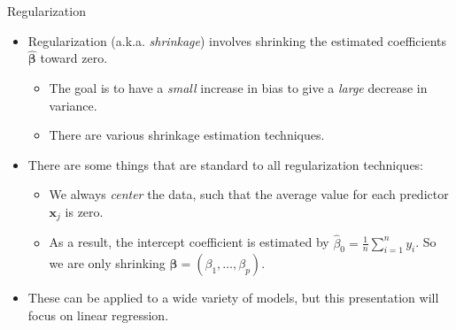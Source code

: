 \documentclass[8pt]{beamer}
\newcommand{\mydef}[1]{\textcolor{SteelBlue3}{\textit{#1}}} %
\begin{document}
\begin{frame}{Regularization}

\begin{itemize}
    \item Regularization (a.k.a. \mydef{shrinkage}) involves shrinking the estimated coefficients $\hat{\bm{\beta}}$ toward zero. 
\begin{itemize}
    \item The goal is to have a \textit{small} increase in bias to give a \textit{large} decrease in variance. 
    \item There are various shrinkage estimation techniques. 
\end{itemize}

    \item There are some things that are standard to all regularization techniques: 
\begin{itemize}
    \item We always \mydef{center} the data, such that the average value for each predictor $\mathbf{x}_j$ is zero. 
    \item As a result, the intercept coefficient is estimated by $\displaystyle \hat{\beta}_0 = \frac{1}{n} \sum_{i=1}^n y_i$. So we are only shrinking $\bm{\beta} = (\beta_1,\ldots,\beta_p)$. 
\end{itemize}

    \item These can be applied to a wide variety of models, but this presentation will focus on linear regression.

\end{itemize}  
\end{frame}
\end{document}
